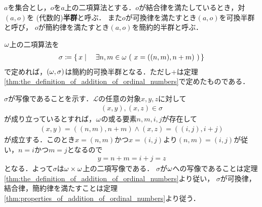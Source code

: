 	
	\begin{screen}
		\begin{dfn}[半群]
			$a$を集合とし，$o$を$a$上の二項算法とする．$o$が結合律を満たしているとき，対$(a,o)$を
			(代数的){\bf 半群}と呼ぶ．
			また$o$が可換律を満たすとき$(a,o)$を可換半群と呼び，
			$o$が簡約律を満たすとき$(a,o)$を簡約的半群と呼ぶ．
		\end{dfn}
	\end{screen}
	
	\begin{screen}
		\begin{thm}
			${\bf \omega}$上の二項算法を
			\begin{align}
				\sigma \coloneqq \Set{x}{\exists n,m \in \omg\ (\ x=((n,m),n+m)\ )}
			\end{align}
			で定めれば，$({\bf \omega},\sigma)$は簡約的可換半群となる．ただし$+$は定理
			\ref{thm:the_definition_of_addition_of_ordinal_numbers}で定めたものである．
		\end{thm}
	\end{screen}
	
	\begin{prf}
		$\sigma$が写像であることを示す．$\mathcal{L}$の任意の対象$x,y,z$に対して
		\begin{align}
			(x,y),(x,z) \in \sigma
		\end{align}
		が成り立っているとすれば，${\bf \omega}$の或る要素$n,m,i,j$が存在して
		\begin{align}
			(x,y) = ((n,m),n+m) \wedge (x,z) = ((i,j),i+j)
		\end{align}
		が成立する．このとき$x=(n,m)$かつ$x=(i,j)$より$(n,m) = (i,j)$が従い，$n=i$かつ$m=j$となるので
		\begin{align}
			y = n+m = i+j = z
		\end{align}
		となる．よって$\sigma$は${\bf \omega} \times {\bf \omega}$上の二項写像である．
		$\sigma$が${\bf \omega}$への写像であることは定理\ref{thm:the_definition_of_addition_of_ordinal_numbers}より従い，
		$\sigma$が可換律，結合律，簡約律を満たすことは定理\ref{thm:properties_of_addition_of_ordinal_numbers}より従う．
		\QED
	\end{prf}
	
